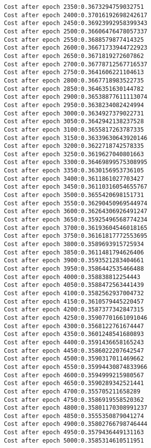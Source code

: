 \documentclass[11pt]{article}
\begin{document}
\begin{Verbatim}[commandchars=\\\{\}]
Cost after epoch 2350:0.3673294759032751
Cost after epoch 2400:0.37016192698242617
Cost after epoch 2450:0.36923992958399343
Cost after epoch 2500:0.36606476478057337
Cost after epoch 2550:0.3688579877414325
Cost after epoch 2600:0.36671733944722923
Cost after epoch 2650:0.3671819272607862
Cost after epoch 2700:0.36778712567716537
Cost after epoch 2750:0.3641606221104613
Cost after epoch 2800:0.3667718983522735
Cost after epoch 2850:0.3646351630144782
Cost after epoch 2900:0.36538877611113074
Cost after epoch 2950:0.3638234082424994
Cost after epoch 3000:0.3634927379022731
Cost after epoch 3050:0.3642942138237528
Cost after epoch 3100:0.3655817263787335
Cost after epoch 3150:0.36339630643920146
Cost after epoch 3200:0.3622718742578335
Cost after epoch 3250:0.3619627040801663
Cost after epoch 3300:0.36469899575308995
Cost after epoch 3350:0.3630156953736105
Cost after epoch 3400:0.3611861027703427
Cost after epoch 3450:0.36110316054655767
Cost after epoch 3500:0.3655420698151731
Cost after epoch 3550:0.36290450969544974
Cost after epoch 3600:0.36264306926491247
Cost after epoch 3650:0.35925496568774234
Cost after epoch 3700:0.36193604546018165
Cost after epoch 3750:0.36161817772553695
Cost after epoch 3800:0.3589693915725934
Cost after epoch 3850:0.3611481794626406
Cost after epoch 3900:0.3593521283404661
Cost after epoch 3950:0.3586442535466488
Cost after epoch 4000:0.358838812254443
Cost after epoch 4050:0.3588472563441439
Cost after epoch 4100:0.3582562937004732
Cost after epoch 4150:0.3610579445220457
Cost after epoch 4200:0.3587377342847315
Cost after epoch 4250:0.35907701661091046
Cost after epoch 4300:0.3568122761674447
Cost after epoch 4350:0.3601248541680893
Cost after epoch 4400:0.3591436658165243
Cost after epoch 4450:0.3586022207642547
Cost after epoch 4500:0.3590317011469662
Cost after epoch 4550:0.35994430874833966
Cost after epoch 4600:0.3594999215980567
Cost after epoch 4650:0.3590289342521441
Cost after epoch 4700:0.355705211658289
Cost after epoch 4750:0.3586919558520362
Cost after epoch 4800:0.35801170308991237
Cost after epoch 4850:0.3555350879041274
Cost after epoch 4900:0.35802766798746444
Cost after epoch 4950:0.3579436449131163
Cost after epoch 5000:0.3585314610511951

    \end{Verbatim}

    \begin{center}
    \end{center}
    { \hspace*{\fill} \\}
    
\end{document}
